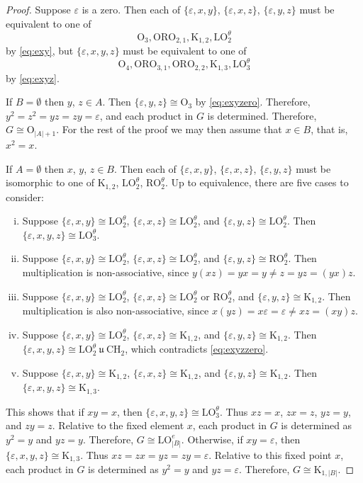 \documentclass{article}
\theoremstyle{plain}
\theoremstyle{definition}
\renewcommand{\O}{\mathrm{O}}
\newcommand{\K}{\mathrm{K}}
\newcommand{\LO}{\mathrm{LO}}
\newcommand{\RO}{\mathrm{RO}}
\newcommand{\ORO}{\mathrm{ORO}}
\newcommand{\CH}{\mathrm{CH}}
\renewcommand{\u}{\ \mathfrak{u}\ }
\begin{document}
\begin{proof}
Suppose $\varepsilon$ is a zero. Then each of $\{\varepsilon,x,y\}$, $\{\varepsilon,x,z\}$, $\{\varepsilon,y,z\}$ must be equivalent to one of\begin{equation}\label{eq:exyzero} \O_3, \ORO_{2,1},\K_{1,2}, \LO_2^\theta\end{equation} by \eqref{eq:exy}, but $\{\varepsilon, x,y,z\}$ must be equivalent to one of\begin{equation}\label{eq:exyzzero}\O_4, \ORO_{3,1}, \ORO_{2,2}, \K_{1,3}, \LO_3^\theta\end{equation} by \eqref{eq:exyz}. 

 If $B=\emptyset$ then $y$, $z\in A$. Then  $\{\varepsilon, y,z\}\cong \O_3$ by \eqref{eq:exyzero}. Therefore, $y^2=z^2=yz=zy=\varepsilon$, and each product in $G$ is determined. Therefore, $G\cong \O_{|A|+1}$. For the rest of the proof we may then assume that $x\in B$, that is, $x^2=x$.

If $A=\emptyset$ then $x$, $y$, $z\in B$. Then each of $\{\varepsilon, x,y\}$, $\{\varepsilon, x,z\}$, $\{\varepsilon, y,z\}$ must be isomorphic to one of $\K_{1,2}$, $\LO_2^\theta$, $\RO_2^\theta$. Up to equivalence, there are five cases to consider:
    \begin{enumerate}[i.]
        \item Suppose $\{\varepsilon, x,y\}\cong \LO_2^\theta$, $\{\varepsilon,x,z\} \cong \LO_2^\theta$, and $\{\varepsilon,y,z\}\cong \LO_2^\theta$. Then $\{\varepsilon,x,y,z\}\cong \LO_3^\theta$.
        \item Suppose $\{\varepsilon, x,y\}\cong \LO_2^\theta$, $\{\varepsilon,x,z\} \cong \LO_2^\theta$, and $\{\varepsilon,y,z\}\cong \RO_2^\theta$. Then multiplication is non-associative, since $y(xz) = yx = y\neq z = yz = (yx)z.$ 
        \item Suppose $\{\varepsilon, x,y\}\cong \LO_2^\theta$, $\{\varepsilon,x,z\} \cong \LO_2^\theta$ or $\RO_2^\theta$, and $\{\varepsilon,y,z\}\cong \K_{1,2}$. Then multiplication is also non-associative, since $x(yz) = x\varepsilon  = \varepsilon \neq xz = (xy)z.$ 
        \item Suppose $\{\varepsilon, x,y\}\cong \LO_2^\theta$, $\{\varepsilon,x,z\} \cong \K_{1,2}$, and $\{\varepsilon,y,z\}\cong \K_{1,2}$. Then $\{\varepsilon,x,y,z\}\cong \LO_2^\theta\u \CH_2$, which contradicts \eqref{eq:exyzzero}.
        \item Suppose $\{\varepsilon, x,y\}\cong \K_{1,2}$, $\{\varepsilon,x,z\} \cong \K_{1,2}$, and $\{\varepsilon,y,z\}\cong \K_{1,2}$. Then $\{\varepsilon,x,y,z\}\cong \K_{1,3}$.
    \end{enumerate}
 This shows that if $xy=x$, then $\{\varepsilon,x,y,z\}\cong \LO_3^\theta$. Thus $xz=x$, $zx=z$, $yz=y$, and $zy=z$. Relative to the fixed element $x$, each product in $G$ is determined as $y^2=y$ and $yz=y$. Therefore, $G\cong \LO_{|B|}^e$.  Otherwise, if $xy=\varepsilon$, then $\{\varepsilon,x,y,z\}\cong \K_{1,3}$. Thus $xz=zx=yz=zy=\varepsilon$. Relative to this fixed point $x$, each product in $G$ is determined as $y^2=y$ and $yz=\varepsilon$. Therefore, $G\cong \K_{1,|B|}$.%


\end{proof}
\end{document}
